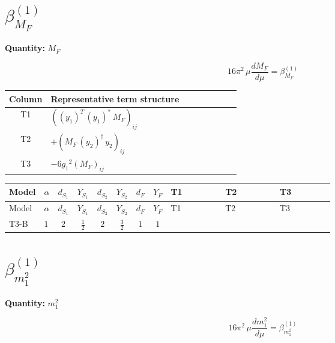 \documentclass[8pt]{article}
\begin{document}
\begin{landscape}
\section*{$\beta_{M_F}^{(1)}$}
\noindent\textbf{Quantity: }$M_F$\par\smallskip
\[16\pi^2\,\mu\frac{d M_F}{d\mu}=\beta_{M_F}^{(1)}\]
\begin{center}
\begin{tabular}{@{}c >{\raggedright\arraybackslash}p{0.82\linewidth}@{}}
\toprule
Column & Representative term structure \\
\midrule
T1 & \(\displaystyle \left(\left({y_1}\right)^{T}\,\left({y_1}\right)^{*}\,{M_F}\right)_{ij}\) \\
\midrule
T2 & \(\displaystyle +\left({M_F}\,\left({y_2}\right)^{\dagger}\,{y_2}\right)_{ij}\) \\
\midrule
T3 & \(\displaystyle -6 {g_1}^2 \left({M_F}\right)_{ij}\) \\
\midrule
\bottomrule
\end{tabular}
\end{center}
\smallskip
\tiny
\begin{longtable}{@{}llcccccc >{\raggedright\arraybackslash}p{0.21\linewidth} >{\raggedright\arraybackslash}p{0.21\linewidth} >{\raggedright\arraybackslash}p{0.21\linewidth}@{}}
\toprule
Model & $\alpha$ & $d_{S_1}$ & $Y_{S_1}$ & $d_{S_2}$ & $Y_{S_2}$ & $d_F$ & $Y_F$ & T1 & T2 & T3 \\
\midrule
\endfirsthead
\toprule
Model & $\alpha$ & $d_{S_1}$ & $Y_{S_1}$ & $d_{S_2}$ & $Y_{S_2}$ & $d_F$ & $Y_F$ & T1 & T2 & T3 \\
\midrule
\endhead
T3-B & $1$ & $2$ & $\frac{1}{2}$ & $2$ & $\frac{3}{2}$ & $1$ & $1$ & \scriptsize\adjustbox{max width=\linewidth}{$\begin{gathered} \left(\left({y_1}\right)^{T}\,\left({y_1}\right)^{*}\,{M_F}\right)_{ij}\end{gathered}$} & \scriptsize\adjustbox{max width=\linewidth}{$\begin{gathered} +\left({M_F}\,\left({y_2}\right)^{\dagger}\,{y_2}\right)_{ij}\end{gathered}$} & \scriptsize\adjustbox{max width=\linewidth}{$\begin{gathered} -6 {g_1}^2 \left({M_F}\right)_{ij}\end{gathered}$} \\
\midrule
\bottomrule
\end{longtable}
\clearpage
\section*{$\beta_{m_1^2}^{(1)}$}
\noindent\textbf{Quantity: }$m_1^2$\par\smallskip
\[16\pi^2\,\mu\frac{d m_1^2}{d\mu}=\beta_{m_1^2}^{(1)}\]

\end{landscape}
\end{document}
